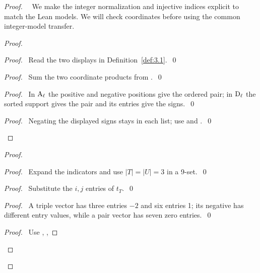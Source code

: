 \begin{proof}
 \pfsketch\ \new\ We make the integer normalization and injective indices explicit
 to match the Lean models. We will check coordinates before using the common integer-model transfer.
 \begin{proof}
  \begin{proof}\pf\ Read the two displays in Definition~\ref{def:3.1}.~\qed\end{proof}
  \begin{proof}\pf\ Sum the two coordinate products from .~\qed\end{proof}
  \begin{proof}\pf\ In $\mathrm{A}_\ell$ the positive and negative positions give the ordered
   pair; in $\mathrm{D}_\ell$ the sorted support gives the pair and its entries give the signs.~\qed\end{proof}
  \qedstep
  \begin{proof}\pf\ Negating the displayed signs stays in each list;
   use  and .~\qed\end{proof}
 \end{proof}
 \begin{proof}
  \begin{proof}\pf\ Expand the indicators and use $|T|=|U|=3$ in a 9-set.~\qed\end{proof}
  \begin{proof}\pf\ Substitute the $i,j$ entries of $t_T$.~\qed\end{proof}
  \begin{proof}\pf\ A triple vector has three entries $-2$ and six entries 1;
   its negative has different entry values, while a pair vector has seven zero entries.~\qed\end{proof}
  \qedstep
  \begin{proof}\pf\ Use , ,

\end{proof}
\end{proof}
\end{proof}
